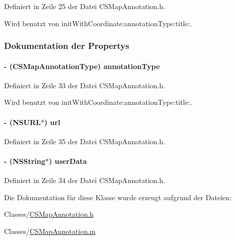 Definiert in Zeile 25 der Datei CSMapAnnotation.h.

Wird benutzt von initWithCoordinate:annotationType:title:.

\subsubsection{Dokumentation der Propertys}
\hypertarget{interface_c_s_map_annotation_a073d4596a4598c6e8b4b6c1acb24cc4d}{
\paragraph[{annotationType}]{\setlength{\rightskip}{0pt plus 5cm}-\/ ({\bf CSMapAnnotationType}) annotationType}\hfill}
\label{interface_c_s_map_annotation_a073d4596a4598c6e8b4b6c1acb24cc4d}


Definiert in Zeile 33 der Datei CSMapAnnotation.h.

Wird benutzt von initWithCoordinate:annotationType:title:.\hypertarget{interface_c_s_map_annotation_a181ec27d42b87d0115b9f3df411fdbb7}{
\paragraph[{url}]{\setlength{\rightskip}{0pt plus 5cm}-\/ (NSURL$\ast$) url}\hfill}
\label{interface_c_s_map_annotation_a181ec27d42b87d0115b9f3df411fdbb7}


Definiert in Zeile 35 der Datei CSMapAnnotation.h.\hypertarget{interface_c_s_map_annotation_a8afd11417c3990f0db0c9437da102419}{
\paragraph[{userData}]{\setlength{\rightskip}{0pt plus 5cm}-\/ (NSString$\ast$) userData}\hfill}
\label{interface_c_s_map_annotation_a8afd11417c3990f0db0c9437da102419}


Definiert in Zeile 34 der Datei CSMapAnnotation.h.

Die Dokumentation für diese Klasse wurde erzeugt aufgrund der Dateien:\begin{DoxyCompactItemize}
\item 
Classes/\hyperlink{_c_s_map_annotation_8h}{CSMapAnnotation.h}\item 
Classes/\hyperlink{_c_s_map_annotation_8m}{CSMapAnnotation.m}\end{DoxyCompactItemize}
